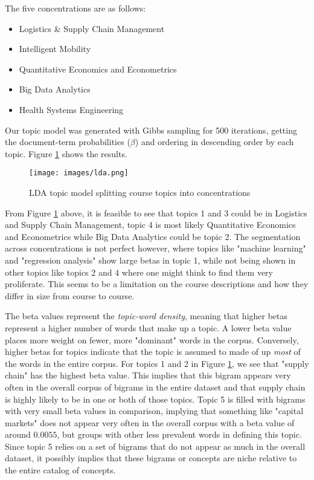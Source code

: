 \documentclass[11pt]{report}
\begin{document}
The five concentrations are as follows:   
\begin{itemize}
	\item{Logistics \& Supply Chain Management }
	\item{Intelligent Mobility}
	\item{Quantitative Economics and Econometrics}
	\item{Big Data Analytics}
	\item{Health Systems Engineering}

\end{itemize}

Our topic model was generated with Gibbs sampling for 500 iterations,  getting the document-term probabilities ($\beta$) and ordering in descending order by each topic. Figure \ref{fig:lda} shows the results.


\begin{figure}[H]
\centering

\texttt{[image: images/lda.png]}
\caption{LDA topic model splitting course topics into concentrations}
\label{fig:lda}
\end{figure}

From Figure \ref{fig:lda} above, it is feasible to see that topics 1 and 3 could be in Logistics and Supply Chain Management, topic 4 is most likely Quantitative Economics and Econometrics while Big Data Analytics could be topic 2. The segmentation across concentrations is not perfect however, where topics like "machine learning" and "regression analysis" show large betas in topic 1, while not being shown in other topics like topics 2 and 4 where one might think to find them very proliferate. This seems to be a limitation on the course descriptions and how they differ in size from course to course.  

The beta values represent the \textit{topic-word density}, meaning that higher betas represent a higher number of words that make up a topic.  A lower beta value places more weight on fewer, more "dominant" words in the corpus.  Conversely,  higher betas for topics indicate that the topic is assumed to made of up \textit{most} of the words in the entire corpus.  For topics 1 and 2 in Figure \ref{fig:lda}, we see that "supply chain" has the highest beta value. This implies that this bigram appears very often in the overall corpus of bigrams in the entire dataset and that supply chain is highly likely to be in one or both of those topics.  Topic 5 is filled with bigrams with very small beta values in comparison,  implying that something like "capital markets" does not appear very often in the overall corpus with a beta value of around $0.0055$,  but groups with other less prevalent words in defining this topic.  Since topic 5 relies on a set of bigrams that do not appear as much in the overall dataset, it possibly implies that these bigrams or concepts are niche relative to the entire catalog of concepts.
\end{document}
